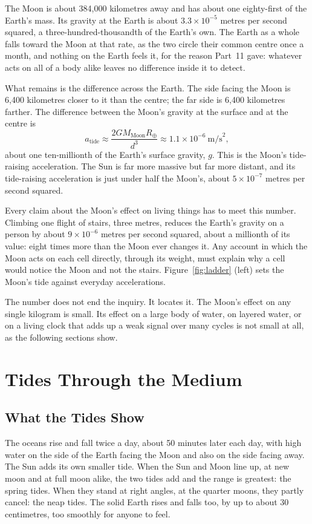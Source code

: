 \documentclass[11pt,a4paper]{article}
\begin{document}
The Moon is about 384,000 kilometres away and has about one eighty-first of the Earth's mass. Its gravity at the Earth is about $3.3\times10^{-5}$ metres per second squared, a three-hundred-thousandth of the Earth's own. The Earth as a whole falls toward the Moon at that rate, as the two circle their common centre once a month, and nothing on the Earth feels it, for the reason Part~11 gave: whatever acts on all of a body alike leaves no difference inside it to detect.

What remains is the difference across the Earth. The side facing the Moon is 6,400 kilometres closer to it than the centre; the far side is 6,400 kilometres farther. The difference between the Moon's gravity at the surface and at the centre is
\[
a_{\text{tide}} \approx \frac{2GM_{\text{Moon}}R_{\oplus}}{d^{3}} \approx 1.1\times10^{-6}\ \text{m/s}^2 ,
\]
about one ten-millionth of the Earth's surface gravity, $g$. This is the Moon's tide-raising acceleration. The Sun is far more massive but far more distant, and its tide-raising acceleration is just under half the Moon's, about $5\times10^{-7}$ metres per second squared.

Every claim about the Moon's effect on living things has to meet this number. Climbing one flight of stairs, three metres, reduces the Earth's gravity on a person by about $9\times10^{-6}$ metres per second squared, about a millionth of its value: eight times more than the Moon ever changes it. Any account in which the Moon acts on each cell directly, through its weight, must explain why a cell would notice the Moon and not the stairs. Figure~\ref{fig:ladder} (left) sets the Moon's tide against everyday accelerations.

The number does not end the inquiry. It locates it. The Moon's effect on any single kilogram is small. Its effect on a large body of water, on layered water, or on a living clock that adds up a weak signal over many cycles is not small at all, as the following sections show.

\section{Tides Through the Medium}
\label{sec:tides}

\subsection*{What the Tides Show}

The oceans rise and fall twice a day, about 50 minutes later each day, with high water on the side of the Earth facing the Moon and also on the side facing away. The Sun adds its own smaller tide. When the Sun and Moon line up, at new moon and at full moon alike, the two tides add and the range is greatest: the spring tides. When they stand at right angles, at the quarter moons, they partly cancel: the neap tides. The solid Earth rises and falls too, by up to about 30 centimetres, too smoothly for anyone to feel.
\end{document}
